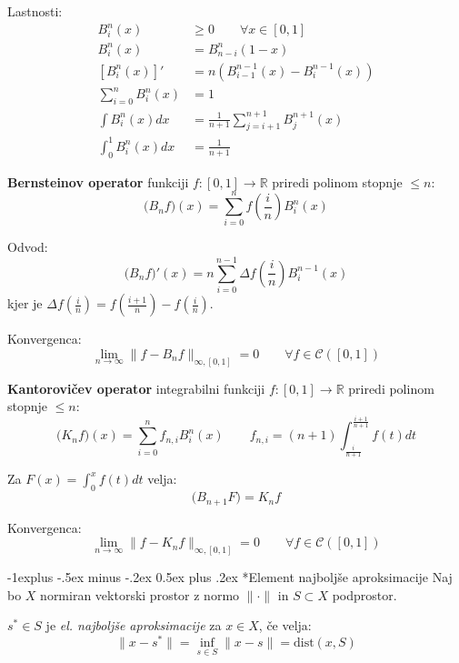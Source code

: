 \documentclass[a3paper,9pt]{extarticle}
\makeatletter
\renewcommand{\subsection}{\@startsection{subsection}{2}{0mm}%
                                {-1explus -.5ex minus -.2ex}%
                                {0.5ex plus .2ex}%
                                {\normalfont\normalsize\bfseries}}
\makeatother
\begin{document}
\begin{multicols}{5}
Lastnosti:
\begin{align*}
	B_i^n(x) &\geq 0 \qquad \forall x \in [0, 1] \\
	B_i^n(x) &= B_{n-i}^n(1-x) \\
	\left[B_i^n(x)\right]' &= n \left( B_{i-1}^{n-1}(x) - B_i^{n-1}(x)\right) \\
	\sum_{i=0}^n B_i^n(x) &= 1 \\
	\int B_i^n(x) dx &= \frac{1}{n+1} \sum_{j=i+1}^{n+1} B_j^{n+1}(x) \\
	\int_0^1 B_i^n(x) dx &= \frac{1}{n+1}
\end{align*}

\textbf{Bernsteinov operator} funkciji $f: [0, 1] \to \mathbb{R}$ priredi polinom stopnje $\leq n$:
\[ \big(B_n f\big)(x) = \sum_{i=0}^{n} f\left(\frac{i}{n}\right)  B_i^n(x)\]

Odvod:
\[ \big(B_n f\big)'(x) = n\sum_{i=0}^{n-1} \Delta f\left(\frac{i}{n}\right)  B_i^{n-1}(x) \]
kjer je $ \Delta f\left(\frac{i}{n}\right) = f\left(\frac{i+1}{n}\right) - f\left(\frac{i}{n}\right)$.

Konvergenca:
\[\lim_{n \to \infty} \| f - B_n f \|_{\infty, [0,1]} = 0 \qquad \forall f \in \mathcal{C}([0,1]) \]

\textbf{Kantorovičev operator} integrabilni funkciji $f: [0, 1] \to \mathbb{R}$ priredi polinom stopnje $\leq n$:
\[ \big(K_n f\big)(x) = \sum_{i=0}^{n} f_{n,i} B_i^n(x) \qquad f_{n,i} = (n+1) \int_{\frac{i}{n+1}}^{\frac{i+1}{n+1}} f(t) dt \]

Za $F(x) = \int_0^x f(t) dt$ velja:
\[\big(B_{n+1} F \big) = K_n f \]

Konvergenca:
\[ \lim_{n \to \infty} \| f - K_n f \|_{\infty, [0, 1]} = 0 \qquad \forall f \in \mathcal{C}([0,1])\]


\subsection*{Element najboljše aproksimacije}
Naj bo $X$ normiran vektorski prostor z normo $\| \cdot \|$ in $S \subset X$ podprostor.

$s^* \in S$ je \textit{el. najboljše aproksimacije} za $x \in X$, če velja:
\[ \| x - s^* \| = \inf_{s \in S} \| x - s \| = \text{dist}(x, S) \]



\end{multicols}
\end{document}
